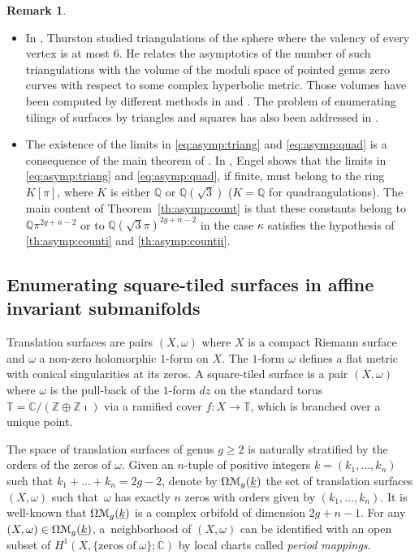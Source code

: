 \documentclass[11pt]{article}
\newcommand{\Subsection}{\subsection}
\newcommand{\skpt}{\smallskip}
\numberwithin{equation}{section}
\let\mathcal\EuScript
\theoremstyle{plain}
\theoremstyle{definition}
\newtheorem{Remark}[Theorem]{Remark}
\def\C{\mathbb{C}}
\newcommand\Z{\mathbb{Z}}
\newcommand{\Q}{\mathbb{Q}}
\newcommand{\Tbb}{\mathbb{T}}
\newcommand{\Mcal}{\mathcal{M}}
\let\omg\omega
\let\ul\underline
\newcommand{\trate}{\Omega\Mcal_{g}(\ul{k})}
\begin{document}
\skpt
\begin{Remark}\label{rk:limit:known}
\begin{itemize}
\item
In \cite{Thurston98}, Thurston studied triangulations of the sphere where the valency of every vertex is at most $6$.
He relates the asymptotics of the number of such triangulations with the volume of the moduli space of pointed genus zero curves with respect to some complex hyperbolic metric. Those volumes have been computed by different methods in \cite{McMullen17} and \cite{KN18}.
The problem of enumerating tilings of surfaces by triangles and squares has also been addressed in \cite{ES18,Engel-I,Engel-II}.

\item The existence of the limits in \eqref{eq:asymp:triang} and \eqref{eq:asymp:quad} is a consequence of the main theorem of \cite{Ngu19}. In \cite{Engel-I}, Engel shows that the limits in \eqref{eq:asymp:triang} and \eqref{eq:asymp:quad}, if finite, must belong to the ring $K[\pi]$, where $K$ is either $\Q$ or $\Q(\sqrt{3})$ ($K=\Q$ for quadrangulations). The main content of Theorem~\ref{th:asymp:count} is that these constants belong to $\Q\pi^{2g+n-2}$ or to $\Q(\sqrt{3}\pi)^{2g+n-2}$ in the case $\kappa$ satisfies the hypothesis of \eqref{th:asymp:counti} and \eqref{th:asymp:countii}.
\end{itemize}
\end{Remark}

\Subsection{Enumerating square-tiled surfaces in affine invariant submanifolds}\label{sec:enum:sq:tiled}
Translation surfaces are pairs $(X,\omega)$ where $X$ is a compact Riemann surface and $\omega$ a non-zero holomorphic $1$-form on $X$. The $1$-form $\omg$ defines a flat metric with conical singularities at its zeros.
A square-tiled surface is a pair $(X,\omega)$ where $\omega$ is the pull-back of the $1$-form $dz$ on the standard torus $\Tbb=\C/(\Z\oplus\Z\imath)$ via a ramified cover $f: X\to \Tbb$, which is branched over a unique point.

The space of translation surfaces of genus $g\geq 2$ is naturally stratified by the orders of the zeros of $\omega$. Given an $n$-tuple of positive integers $\ul{k}=(k_1,\dots,k_n)$ such that \hbox{$k_1+\dots+k_n=2g-2$}, denote by $\trate$ the set of translation surfaces $(X,\omega)$ such that~$\omega$ has exactly $n$ zeros with orders given by $(k_1,\dots,k_n)$.
It is well-known that $\trate$ is a complex orbifold of dimension $2g+n-1$. For any $(X,\omega)\in \trate$, a~neighborhood of $(X,\omega)$ can be identified with an open subset of $H^1(X,\{\textrm{zeros of} \; \omega\}; \C)$ by local charts called \emph{period mappings}.
\end{document}
